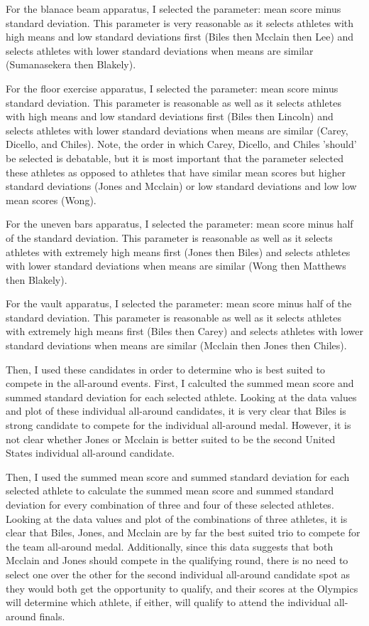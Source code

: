 \documentclass[12pt]{article}
\begin{document}
For the blanace beam apparatus, I selected the parameter: mean score minus standard deviation. This parameter 
is very reasonable as it selects athletes with high means and low standard deviations first (Biles then Mcclain 
then Lee) and selects athletes with lower standard deviations when means are similar (Sumanasekera then Blakely).

For the floor exercise apparatus, I selected the parameter: mean score minus standard deviation. This parameter 
is reasonable as well as it selects athletes with high means and low standard deviations first (Biles then Lincoln) 
and selects athletes with lower standard deviations when means are similar (Carey, Dicello, and Chiles). Note, the 
order in which Carey, Dicello, and Chiles 'should' be selected is debatable, but it is most important that the 
parameter selected these athletes as opposed to athletes that have similar mean scores but higher standard deviations 
(Jones and Mcclain) or low standard deviations and low low mean scores (Wong).

For the uneven bars apparatus, I selected the parameter: mean score minus half of the standard deviation. 
This parameter is reasonable as well as it selects athletes with extremely high means first (Jones then Biles) and selects 
athletes with lower standard deviations when means are similar (Wong then Matthews then Blakely). 

For the vault apparatus, I selected the parameter: mean score minus half of the standard deviation. 
This parameter is reasonable as well as it selects athletes with extremely high means first (Biles then Carey) and selects 
athletes with lower standard deviations when means are similar (Mcclain then Jones then Chiles). 

Then, I used these candidates in order to determine who is best suited to compete in the all-around events. 
First, I calculted the summed mean score and summed standard deviation for each selected athlete. Looking at the data 
values and plot of these individual all-around candidates, it is very clear that Biles is strong candidate to 
compete for the individual all-around medal. However, it is not clear whether Jones or Mcclain is better suited 
to be the second United States individual all-around candidate.

Then, I used the summed mean score and summed standard deviation for each selected athlete to calculate the 
summed mean score and summed standard deviation for every combination of 
three and four of these selected athletes. Looking at the data values and plot of the combinations of three athletes, 
it is clear that Biles, Jones, and Mcclain are by far the best suited trio to compete for the team all-around medal. 
Additionally, since this data suggests that both Mcclain and Jones should compete in the qualifying round, there 
is no need to select one over the other for the second individual all-around candidate spot as they would both get 
the opportunity to qualify, and their scores at the Olympics will determine which athlete, if either, will qualify 
to attend the individual all-around finals. 
\end{document}
